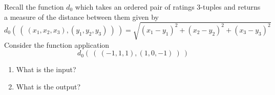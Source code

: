 
Recall the function
$d_0$ which takes an ordered pair of ratings $3$-tuples and returns a measure
of the distance between them 
given by
\[
d_0 (~(~ (x_1, x_2, x_3), (y_1, y_2, y_3) ~) ~) = \sqrt{ (x_1 - y_1)^2 + (x_2 - y_2)^2 + (x_3 -y_3)^2}
\]
Consider the function application 
\[
  d_0 (~( ~(-1,1,1), (1, 0, -1)~) ~)
\]
\begin{enumerate}
    \item What is the input? 
    \item What is the output?
\end{enumerate}